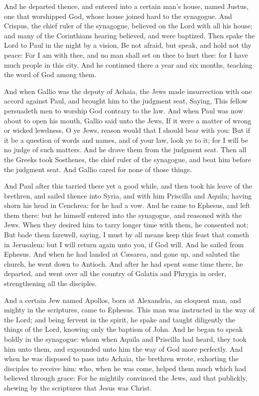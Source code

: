  And he departed thence, and entered into a certain man's
house, named Justus, one that worshipped God, whose house joined hard to
the synagogue.  And Crispus, the chief ruler of the
synagogue, believed on the Lord with all his house; and many of the
Corinthians hearing believed, and were baptized.  Then
spake the Lord to Paul in the night by a vision, Be not afraid, but
speak, and hold not thy peace:  For I am with thee, and
no man shall set on thee to hurt thee: for I have much people in this
city.  And he continued there a year and six months,
teaching the word of God among them.

 And when Gallio was the deputy of Achaia, the Jews made
insurrection with one accord against Paul, and brought him to the
judgment seat,  Saying, This fellow persuadeth men to
worship God contrary to the law.  And when Paul was now
about to open his mouth, Gallio said unto the Jews, If it were a matter
of wrong or wicked lewdness, O ye Jews, reason would that I should bear
with you:  But if it be a question of words and names,
and of your law, look ye to it; for I will be no judge of such matters.
 And he drave them from the judgment seat.
 Then all the Greeks took Sosthenes, the chief ruler of
the synagogue, and beat him before the judgment seat. And Gallio cared
for none of those things.

 And Paul after this tarried there yet a good while, and
then took his leave of the brethren, and sailed thence into Syria, and
with him Priscilla and Aquila; having shorn his head in Cenchrea: for he
had a vow.  And he came to Ephesus, and left them there:
but he himself entered into the synagogue, and reasoned with the Jews.
 When they desired him to tarry longer time with them, he
consented not;  But bade them farewell, saying, I must by
all means keep this feast that cometh in Jerusalem: but I will return
again unto you, if God will. And he sailed from Ephesus. 
And when he had landed at Cæsarea, and gone up, and saluted the church,
he went down to Antioch.  And after he had spent some
time there, he departed, and went over all the country of Galatia and
Phrygia in order, strengthening all the disciples.

 And a certain Jew named Apollos, born at Alexandria, an
eloquent man, and mighty in the scriptures, came to Ephesus.
 This man was instructed in the way of the Lord; and
being fervent in the spirit, he spake and taught diligently the things
of the Lord, knowing only the baptism of John.  And he
began to speak boldly in the synagogue: whom when Aquila and Priscilla
had heard, they took him unto them, and expounded unto him the way of
God more perfectly.  And when he was disposed to pass
into Achaia, the brethren wrote, exhorting the disciples to receive him:
who, when he was come, helped them much which had believed through
grace:  For he mightily convinced the Jews, and that
publickly, shewing by the scriptures that Jesus was Christ.

